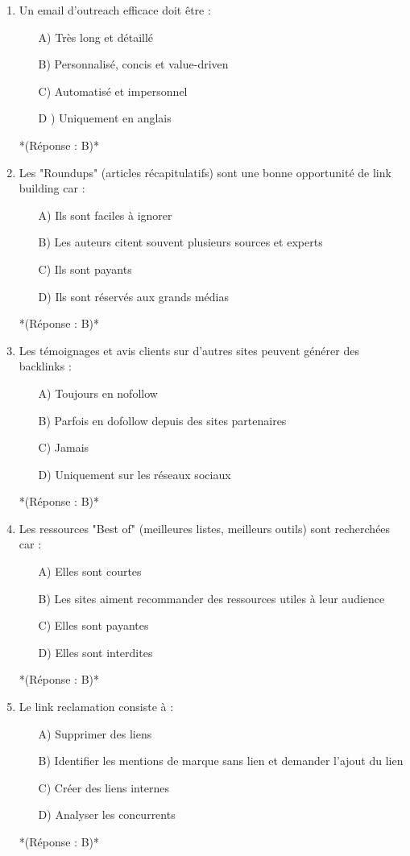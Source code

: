 \documentclass[12pt,a4paper,twoside]{report}
\begin{document}
\begin{enumerate}
\item Un email d'outreach efficace doit être :
\begin{itemize}
\item[A)] Très long et détaillé
\item[B)] Personnalisé, concis et value-driven
\item[C)] Automatisé et impersonnel
\item[D]) Uniquement en anglais
\end{itemize}
*(Réponse : B)*

\item Les "Roundups" (articles récapitulatifs) sont une bonne opportunité de link building car :
\begin{itemize}
\item[A)] Ils sont faciles à ignorer
\item[B)] Les auteurs citent souvent plusieurs sources et experts
\item[C)] Ils sont payants
\item[D)] Ils sont réservés aux grands médias
\end{itemize}
*(Réponse : B)*

\item Les témoignages et avis clients sur d'autres sites peuvent générer des backlinks :
\begin{itemize}
\item[A)] Toujours en nofollow
\item[B)] Parfois en dofollow depuis des sites partenaires
\item[C)] Jamais
\item[D)] Uniquement sur les réseaux sociaux
\end{itemize}
*(Réponse : B)*

\item Les ressources "Best of" (meilleures listes, meilleurs outils) sont recherchées car :
\begin{itemize}
\item[A)] Elles sont courtes
\item[B)] Les sites aiment recommander des ressources utiles à leur audience
\item[C)] Elles sont payantes
\item[D)] Elles sont interdites
\end{itemize}
*(Réponse : B)*

\item Le link reclamation consiste à :
\begin{itemize}
\item[A)] Supprimer des liens
\item[B)] Identifier les mentions de marque sans lien et demander l'ajout du lien
\item[C)] Créer des liens internes
\item[D)] Analyser les concurrents
\end{itemize}
*(Réponse : B)*


\end{enumerate}
\end{document}
